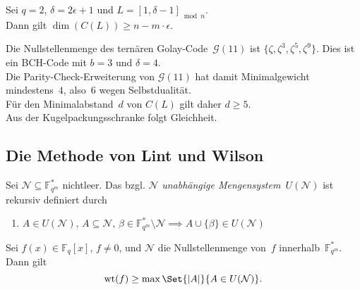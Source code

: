 \documentclass{cheat-sheet}
\newcommand{\F}{\mathbb{F}} %
\DeclareMathOperator{\wt}{wt} %
\newcommand{\Golay}{\mathcal{G}} %
\begin{document}
\begin{samepage}

\begin{satz}
  Sei $q = 2$, $\delta = 2 \epsilon + 1$ und $L = [1, \delta - 1]_{\bmod{n}}$. \\
  Dann gilt \enspace $\dim(C(L)) \geq n - m \cdot \epsilon$.
\end{satz}


\begin{bsp}
  Die Nullstellenmenge des ternären Golay-Code~$\Golay(11)$ ist $\{ \zeta, \zeta^3, \zeta^5, \zeta^9 \}$.
  Dies ist ein BCH-Code mit $b = 3$ und $\delta = 4$. \\
  Die Parity-Check-Erweiterung von $\Golay(11)$ hat damit Minimalgewicht mindestens~$4$, also~$6$ wegen Selbstdualität. \\
  Für den Minimalabstand~$d$ von $C(L)$ gilt daher $d \geq 5$. \\
  Aus der Kugelpackungsschranke folgt Gleichheit.
\end{bsp}




\subsection{Die Methode von Lint und Wilson}

\end{samepage}

\begin{defn}
  Sei $\mathcal{N} \subseteq \F_{q^m}^*$ nichtleer.
  Das bzgl. $\mathcal{N}$ \emph{unabhängige Mengensystem}~$U(\mathcal{N})$ ist rekursiv definiert durch
  \begin{enumerate}[label=\alph*), leftmargin=1.8em]
    \miniitem{0.6 \linewidth}{$A \in U(\mathcal{N}), \, \gamma \in \F_{q^m}^* \implies \gamma A \in U(\mathcal{N})$}
    \item $A \in U(\mathcal{N}), \, A \subseteq \mathcal{N}, \, \beta \in \F_{q^m}^* \setminus \mathcal{N} \implies A \cup \{ \beta \} \in U(\mathcal{N})$
  \end{enumerate}
\end{defn}

\begin{prop}
  Sei $f(x) \in \F_q[x]$, $f \neq 0$, und $\mathcal{N}$ die Nullstellenmenge von~$f$ innerhalb~$\F_{q^m}^*$.
  Dann gilt
  \[
    \wt(f) \geq \max \Set{\abs{A}}{A \in U(\mathcal{N})}.
  \]
\end{prop}
\end{document}
